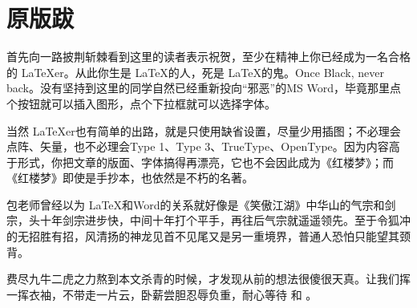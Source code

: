 \chapter{原版跋}

首先向一路披荆斩棘看到这里的读者表示祝贺，至少在精神上你已经成为一名合格的 \LaTeX{}er。从此你生是 \LaTeX 的人，死是 \LaTeX 的鬼。Once Black, never back。没有坚持到这里的同学自然已经重新投向“邪恶”的MS Word，毕竟那里点个按钮就可以插入图形，点个下拉框就可以选择字体。

当然 \LaTeX{}er也有简单的出路，就是只使用缺省设置，尽量少用插图；不必理会点阵、矢量，也不必理会Type 1、Type 3、TrueType、OpenType。因为内容高于形式，你把文章的版面、字体搞得再漂亮，它也不会因此成为《红楼梦》；而《红楼梦》即使是手抄本，也依然是不朽的名著。

包老师曾经以为 \LaTeX 和Word的关系就好像是《笑傲江湖》中华山的气宗和剑宗，头十年剑宗进步快，中间十年打个平手，再往后气宗就遥遥领先。至于令狐冲的无招胜有招，风清扬的神龙见首不见尾又是另一重境界，普通人恐怕只能望其颈背。

费尽九牛二虎之力熬到本文杀青的时候，才发现从前的想法很傻很天真。让我们挥一挥衣袖，不带走一片云，卧薪尝胆忍辱负重，耐心等待 \XeTeX 和 \LuaTeX。